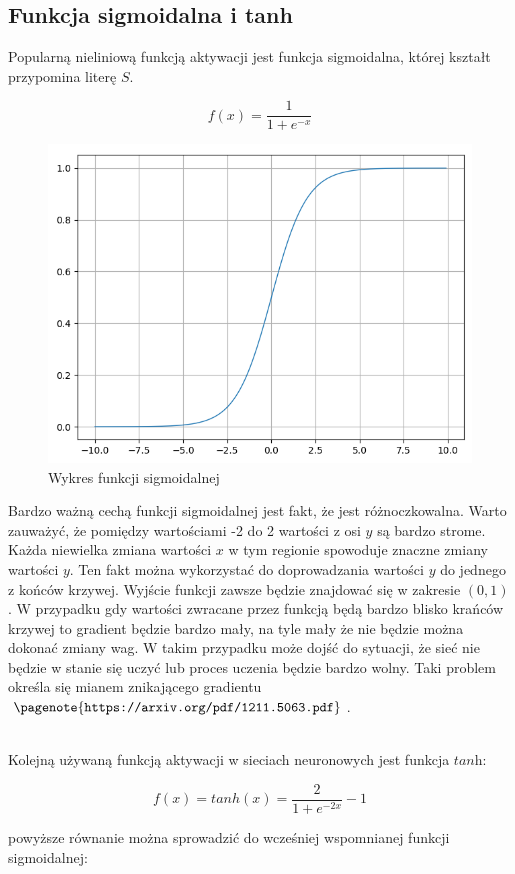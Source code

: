 \subsection{Funkcja sigmoidalna i tanh}

Popularną nieliniową funkcją aktywacji jest funkcja sigmoidalna, której kształt przypomina literę $S$.

\begin{equation}
	f(x) = \frac{1}{1 + e^{-x}}
\end{equation}

\begin{figure}[H]
	\centering
	\includegraphics[width=0.5\linewidth]{sigmoid}
	\caption{Wykres funkcji sigmoidalnej}
	\label{fig:sigmoid}
\end{figure}

Bardzo ważną cechą funkcji sigmoidalnej jest fakt, że jest różnoczkowalna. Warto zauważyć, że pomiędzy wartościami -2 do 2 wartości z osi $y$ są bardzo strome. Każda niewielka zmiana wartości $x$ w tym regionie spowoduje znaczne zmiany wartości $y$. Ten fakt można wykorzystać do doprowadzania wartości $y$ do jednego z końców krzywej. Wyjście funkcji zawsze będzie znajdować się w zakresie $(0, 1)$. W przypadku gdy wartości zwracane przez funkcją będą bardzo blisko krańców krzywej to gradient będzie bardzo mały, na tyle mały że nie będzie można dokonać zmiany wag. W takim przypadku może dojść do sytuacji, że sieć nie będzie w stanie się uczyć lub proces uczenia będzie bardzo wolny. Taki problem określa się mianem znikającego gradientu$\pagenote{\texttt{https://arxiv.org/pdf/1211.5063.pdf}}$.

\\

Kolejną używaną funkcją aktywacji w sieciach neuronowych jest funkcja $\textit{tanh}$:

\begin{equation}
f(x) = tanh(x) = \dfrac{2}{1 + e^{-2x}} - 1
\end{equation}

powyższe równanie można sprowadzić do wcześniej wspomnianej funkcji sigmoidalnej:

